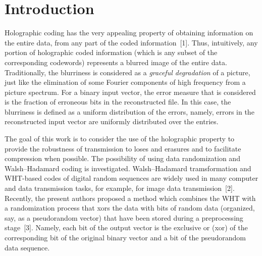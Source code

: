 \vspace*{2pt}





      \thispagestyle{headings}

      \begin{multicols}{2}

            \label{st\stat}


\section{Introduction}

\noindent Holographic coding has the very appealing property of obtaining 
information on the entire data, from any part of the coded information~[1]. 
Thus, intuitively, any portion of holographic coded information (which is any 
subset of the corresponding codewords) represents a blurred image of the entire 
data. Traditionally, the  blurriness is considered as a {\it graceful 
degradation} of a picture, just like the elimination of some Fourier components 
of high frequency from a picture spectrum. For a binary input vector, the  
error measure that is considered is the fraction of erroneous bits in the 
reconstructed file. In this case,  the blurriness is defined as a uniform 
distribution of the errors, namely, errors in the reconstructed input vector 
are uniformly distributed over the entries. 

The  goal of this work is to 
consider the use of the holographic property to provide the robustness of 
transmission to loses and erasures and to facilitate compression when possible. 
The possibility of using data randomization and Walsh--Hadamard 
coding is investigated. Walsh--Hadamard tramsformation and WHT-based codes of digital random 
sequences are widely used in many computer and data transmission tasks, for 
example, for image data transmission~[2]. Recently, the present authors
proposed a method which 
combines the  WHT  with  a randomization process that xors the data with bits 
of random data (organized, say, as a pseudorandom vector) that have been 
stored during a preprocessing stage~[3]. Namely, each bit of the output vector 
is the exclusive or (xor) of the corresponding bit of the original binary vector 
and a  bit of the pseudorandom data sequence. 


\end{multicols}
